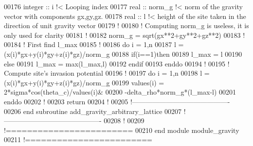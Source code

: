 \begin{DoxyCode}
00176     \textcolor{keywordtype}{integer} :: i \textcolor{comment}{!< Looping index}
00177     \textcolor{keywordtype}{real} :: norm\_g \textcolor{comment}{!< norm of the gravity vector with components gx,gy,gz.}
00178     \textcolor{keywordtype}{real} :: l \textcolor{comment}{!< height of the site taken in the direction of unit gravity
       vector}
00179     \textcolor{comment}{!}
00180     \textcolor{comment}{! Computing norm\_g is useless, it is only used for clarity}
00181     \textcolor{comment}{!}
00182     norm\_g = sqrt(gx**2+gy**2+gz**2)
00183     \textcolor{comment}{!}
00184     \textcolor{comment}{! First find l\_max}
00185     \textcolor{comment}{!}
00186     \textcolor{keyword}{do} i = 1,n
00187        l = (x(i)*gx+y(i)*gy+z(i)*gz)/norm\_g
00188        \textcolor{keyword}{if}(i==1)\textcolor{keyword}{then}
00189           l\_max = l
00190        \textcolor{keyword}{else}
00191           l\_max = max(l\_max,l)
00192        \textcolor{keyword}{endif}
00193     \textcolor{keyword}{enddo}
00194     \textcolor{comment}{!}
00195     \textcolor{comment}{! Compute site's invasion potential}
00196     \textcolor{comment}{!}
00197     \textcolor{keyword}{do} i = 1,n
00198        l = (x(i)*gx+y(i)*gy+z(i)*gz)/norm\_g
00199        values(i) = 2*sigma*cos(theta\_c)/values(i)&
00200                   -delta\_rho*norm\_g*(l\_max-l)
00201     \textcolor{keyword}{enddo}
00202     \textcolor{comment}{! }
00203     return
00204     \textcolor{comment}{!}
00205   \textcolor{comment}{!-------------------------------------------}
00206 \textcolor{keyword}{  end subroutine add\_gravity\_arbitrary\_lattice}
00207   \textcolor{comment}{!-------------------------------------------}
00208   \textcolor{comment}{!}
00209 \textcolor{comment}{!========================}
00210 \textcolor{keyword}{end module module\_gravity}
00211 \textcolor{comment}{!========================}
\end{DoxyCode}
